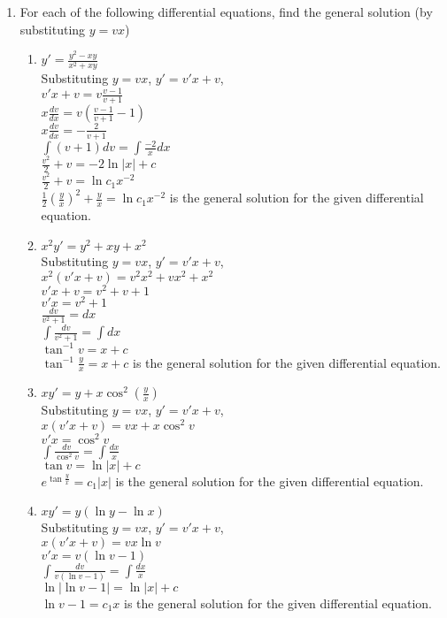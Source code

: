 \documentclass[a4paper]{article}
\begin{document}
\begin{enumerate}
{}

\item{For each of the following differential equations, find the general solution (by substituting $y = vx$)
\begin{enumerate}
\item{$y'=\frac{y^2-xy}{x^2+xy}$
\\Substituting $y=vx$, $y'=v'x+v$,
\\$v'x+v=v\frac{v-1}{v+1}$
\\$x\frac{dv}{dx}=v(\frac{v-1}{v+1}-1)$
\\$x\frac{dv}{dx}=-\frac{2}{v+1}$
\\$\int (v+1) dv=\int \frac{-2}{x}dx$
\\$\frac{v^2}{2}+v=-2\ln |x| +c$
\\$\frac{v^2}{2}+v=\ln c_1x^{-2}$
\\$\frac{1}{2}(\frac{y}{x})^2+\frac{y}{x}=\ln c_1x^{-2}$ is the general solution for the given differential equation.
}
\item{$x^2y'=y^2+xy+x^2$
\\Substituting $y=vx$, $y'=v'x+v$,
\\$x^2(v'x+v)=v^2x^2+vx^2+x^2$
\\$v'x+v=v^2+v+1$
\\$v'x=v^2+1$
\\$\frac{dv}{v^2+1}=dx$
\\$\int \frac{dv}{v^2+1}=\int dx$
\\$\tan^{-1}v=x+c$
\\$\tan^{-1}\frac{y}{x}=x+c$ is the general solution for the given differential equation.
}
\item{$xy'=y+x\cos^2(\frac{y}{x})$
\\Substituting $y=vx$, $y'=v'x+v$,
\\$x(v'x+v)=vx+x\cos^2v$
\\$v'x=\cos^2v$
\\$\int \frac{dv}{\cos^2v}=\int\frac{dx}{x}$
\\$\tan v=\ln |x|+c$ 
\\$e^{\tan \frac{y}{x}} = c_1|x|$ is the general solution for the given differential equation.
}
\item{$xy'=y(\ln y-\ln x)$
\\Substituting $y=vx$, $y'=v'x+v$,
\\$x(v'x+v)=vx\ln v$
\\$v'x=v(\ln v -1)$
\\$\int \frac{dv}{v(\ln v -1)}=\int\frac{dx}{x}$
\\$\ln|\ln v - 1| = \ln |x| + c$
\\$\ln v - 1 = c_1x$ is the general solution for the given differential equation.
}


\end{enumerate}}
\end{enumerate}
\end{document}

